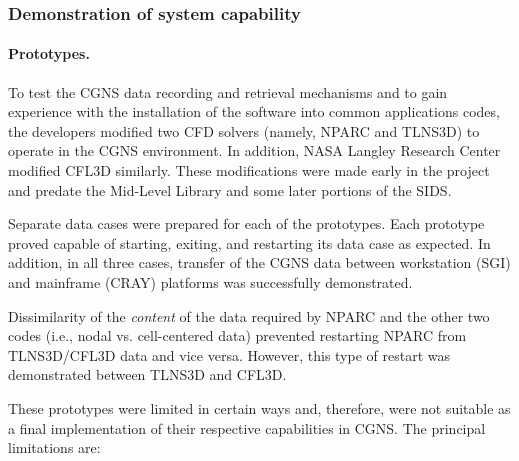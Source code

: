 \subsubsection{Demonstration of system capability}

\paragraph{Prototypes.}
To test the CGNS data recording and retrieval mechanisms and to
gain experience with the installation of the software into common
applications codes, the developers modified two CFD solvers (namely,
NPARC and TLNS3D) to operate in the CGNS environment.
In addition, NASA Langley Research Center modified CFL3D similarly.
These modifications were made early in the project and predate the
Mid-Level Library and some later portions of the SIDS.

Separate data cases were prepared for each of the prototypes.
Each prototype proved capable of starting, exiting, and restarting its
data case as expected.
In addition, in all three cases, transfer of the CGNS data between
workstation (SGI) and mainframe (CRAY) platforms was successfully
demonstrated.

Dissimilarity of the \emph{content} of the data required by NPARC
and the other two codes (i.e., nodal vs. cell-centered data) prevented
restarting NPARC from TLNS3D/CFL3D data and vice versa.
However, this type of restart was demonstrated between TLNS3D and CFL3D.

These prototypes were limited in certain ways and, therefore, were not
suitable as a final implementation of their respective capabilities in
CGNS.
The principal limitations are:

